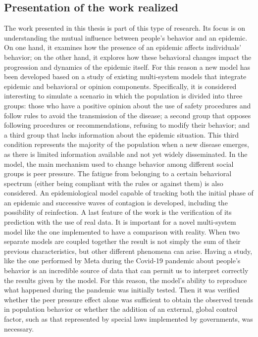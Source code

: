 \subsection{Presentation of the work realized}
The work presented in this thesis is part of this type of research. Its focus is on understanding the mutual influence between people's behavior and an epidemic. On one hand, it examines how the presence of an epidemic affects individuals' behavior; on the other hand, it explores how these behavioral changes impact the progression and dynamics of the epidemic itself. 
For this reason a new model has been developed based on a study of existing multi-system models that integrate epidemic and behavioral or opinion components. Specifically, it is considered interesting to simulate a scenario in which the population is divided into three groups: those who have a positive opinion about the use of safety procedures and follow rules to avoid the transmission of the disease; a second group that opposes following procedures or recommendations, refusing to modify their behavior; and a third group that lacks information about the epidemic situation. This third condition represents the majority of the population when a new disease emerges, as there is limited information available and not yet widely disseminated.
In the model, the main mechanism used to change behavior among different social groups is peer pressure. The fatigue from belonging to a certain behavioral spectrum (either being compliant with the rules or against them) is also considered. An epidemiological model capable of tracking both the initial phase of an epidemic and successive waves of contagion is developed, including the possibility of reinfection.
A last feature of the work is the verification of its prediction with the use of real data. It is important for a novel multi-system model like the one implemented to have a comparison with reality. When two separate models are coupled together the result is not simply the sum of their previous characteristics, but other different phenomena can arise. Having a study, like the one performed by Meta during the Covid-19 pandemic about people's behavior is an incredible source of data that can permit us to interpret correctly the results given by the model. 
For this reason, the model's ability to reproduce what happened during the pandemic was initially tested. Then it was verified whether the peer pressure effect alone was sufficient to obtain the observed trends in population behavior or whether the addition of an external, global control factor, such as that represented by special laws implemented by governments, was necessary.

